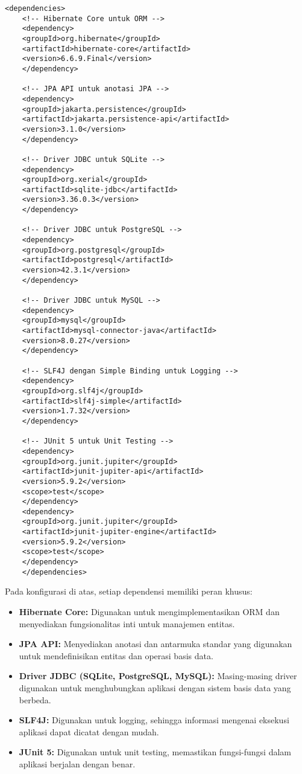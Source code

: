 \begin{lstlisting}[style=XmlStyle]
	<dependencies>
	<!-- Hibernate Core untuk ORM -->
	<dependency>
	<groupId>org.hibernate</groupId>
	<artifactId>hibernate-core</artifactId>
	<version>6.6.9.Final</version>
	</dependency>
	
	<!-- JPA API untuk anotasi JPA -->
	<dependency>
	<groupId>jakarta.persistence</groupId>
	<artifactId>jakarta.persistence-api</artifactId>
	<version>3.1.0</version>
	</dependency>
	
	<!-- Driver JDBC untuk SQLite -->
	<dependency>
	<groupId>org.xerial</groupId>
	<artifactId>sqlite-jdbc</artifactId>
	<version>3.36.0.3</version>
	</dependency>
	
	<!-- Driver JDBC untuk PostgreSQL -->
	<dependency>
	<groupId>org.postgresql</groupId>
	<artifactId>postgresql</artifactId>
	<version>42.3.1</version>
	</dependency>
	
	<!-- Driver JDBC untuk MySQL -->
	<dependency>
	<groupId>mysql</groupId>
	<artifactId>mysql-connector-java</artifactId>
	<version>8.0.27</version>
	</dependency>
	
	<!-- SLF4J dengan Simple Binding untuk Logging -->
	<dependency>
	<groupId>org.slf4j</groupId>
	<artifactId>slf4j-simple</artifactId>
	<version>1.7.32</version>
	</dependency>
	
	<!-- JUnit 5 untuk Unit Testing -->
	<dependency>
	<groupId>org.junit.jupiter</groupId>
	<artifactId>junit-jupiter-api</artifactId>
	<version>5.9.2</version>
	<scope>test</scope>
	</dependency>
	<dependency>
	<groupId>org.junit.jupiter</groupId>
	<artifactId>junit-jupiter-engine</artifactId>
	<version>5.9.2</version>
	<scope>test</scope>
	</dependency>
	</dependencies>
\end{lstlisting}

Pada konfigurasi di atas, setiap dependensi memiliki peran khusus:
\begin{itemize}
	\item \textbf{Hibernate Core:} Digunakan untuk mengimplementasikan ORM dan menyediakan fungsionalitas inti untuk manajemen entitas.
	\item \textbf{JPA API:} Menyediakan anotasi dan antarmuka standar yang digunakan untuk mendefinisikan entitas dan operasi basis data.
	\item \textbf{Driver JDBC (SQLite, PostgreSQL, MySQL):} Masing-masing driver digunakan untuk menghubungkan aplikasi dengan sistem basis data yang berbeda.
	\item \textbf{SLF4J:} Digunakan untuk logging, sehingga informasi mengenai eksekusi aplikasi dapat dicatat dengan mudah.
	\item \textbf{JUnit 5:} Digunakan untuk unit testing, memastikan fungsi-fungsi dalam aplikasi berjalan dengan benar.
\end{itemize}

